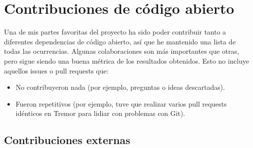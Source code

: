 \chapter{Contribuciones de código abierto}\label{annex:contributions}

%
%
%
%
%
%
%
%
%


\newcommand{\issue} {\begingroup
    \catcode`_=12 \github{issues}{Imagenes/issue.pdf}}
\newcommand{\pr} {\begingroup
    \catcode`_=12 \github{pull}{Imagenes/pr.pdf}}
\newcommand{\github}[5] {%
    \item \texttt{[image: \#2]} \; \emph{#5}\\
        \href{https://github.com/#3/#1/#4}{\texttt{github.com/#3/#1/#4}}
    \endgroup
}

Una de mis partes favoritas del proyecto ha sido poder contribuir tanto a
diferentes dependencias de código abierto, así que he mantenido una lista de
todas las ocurrencias. Algunas colaboraciones son más importantes que otras,
pero sigue siendo una buena métrica de los resultados obtenidos. Esto no incluye
aquellos issues o pull requests que:

\begin{itemize}
    \item No contribuyeron nada (por ejemplo, preguntas o ideas descartadas).

    \item Fueron repetitivos (por ejemplo, tuve que realizar varios pull
        requests idénticos en Tremor para lidiar con problemas con Git).

\end{itemize}

\section{Contribuciones externas}

